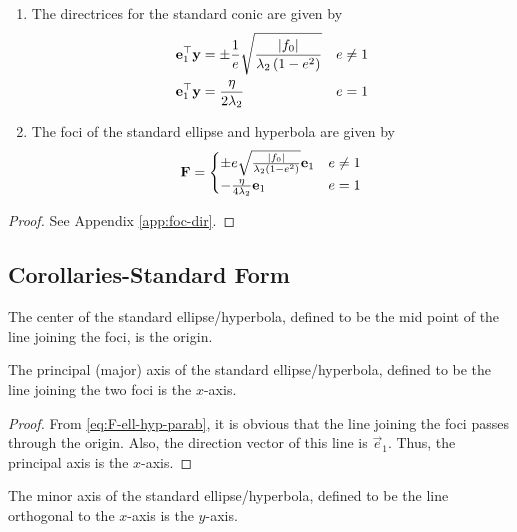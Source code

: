 \documentclass[journal,12pt,onecolumn]{IEEEtran}
\begin{document}
    \begin{theorem}\leavevmode
		\begin{enumerate}
			\item The directrices for the  standard conic are given by 
				\begin{align}
					\label{eq:dx-ell-hyp}
					\mathbf{e}_1^{\top}\mathbf{y} &=  
					\pm \frac{1}{e}\sqrt{\frac{\left\vert f_0\right\vert}{\lambda_2\left(1-e^2\right)}} & e \ne 1
					\\
					\mathbf{e}_1^{\top}\mathbf{y} &= \frac{\eta}{2\lambda_2} & e = 1
					\label{eq:dx-parab}
				\end{align}
    \item The foci of the standard ellipse and hyperbola are given by 
				\begin{align}
					\label{eq:F-ell-hyp-parab}
					\mathbf{F} 
=
					\begin{cases}
						\pm e\sqrt{\frac{\left\vert f_0\right\vert}{\lambda_2\left(1-e^2\right)}}\mathbf{e}_1 & e \ne 1
						\\
						 -\frac{\eta}{4\lambda_2}\mathbf{e}_1 & e = 1
					\end{cases}
				\end{align}
	
		\end{enumerate}
    \end{theorem}
	\begin{proof}%
		See Appendix \ref{app:foc-dir}.
	\end{proof}
	\subsection{Corollaries-Standard Form}
	\begin{corollary}
			\label{corr:center}
			The center of the standard ellipse/hyperbola, defined to be the mid point of the line joining the foci, is the origin.
	\end{corollary}
	\begin{corollary}
		\label{corr:axis}
			The principal (major) axis of the standard ellipse/hyperbola, defined to be the line joining the two foci   is the $x$-axis.  
	\end{corollary}
	\begin{proof}
		From 	\eqref{eq:F-ell-hyp-parab}, it is obvious that the line joining the foci passes through the origin.  Also, the direction vector of this line is $\vec{e}_1$.  Thus, the principal axis is the $x$-axis. 
	\end{proof}
	\begin{corollary}
		\label{corr:minor-axis}
			The minor axis of the standard ellipse/hyperbola, defined to be the line orthogonal to the $x$-axis is the $y$-axis. 
	\end{corollary}
\end{document}
